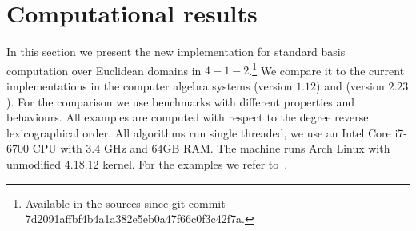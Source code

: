 \section{Computational results}
\label{sec:results}
In this section we present the new implementation for standard basis computation
over Euclidean domains in \singular $4-1-2$.\footnote{Available in the \singular
sources since git commit 7d2091affbf4b4a1a382e5eb0a47f66c0f3c42f7a.}
We compare it to the current implementations in the
computer algebra systems \macaulay (version $1.12$) and \magma (version $2.23$).
For the comparison we use benchmarks with different properties and behaviours.
All examples are computed with respect to the degree reverse lexicographical order.
All algorithms run single threaded, we use an Intel Core i7-6700 CPU with $3.4$ GHz
and $64$GB RAM. The machine runs Arch Linux with unmodified 4.18.12 kernel. For
the examples we refer to~\cite{singular-benchmarks}.

